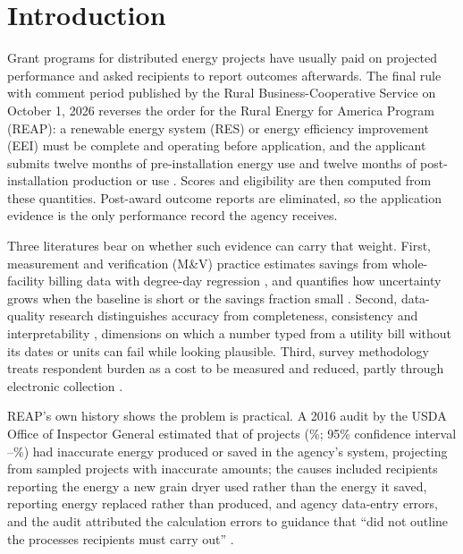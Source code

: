\documentclass[preprint,12pt]{elsarticle}
\begin{document}
\section{Introduction}

Grant programs for distributed energy projects have usually paid on projected
performance and asked recipients to report outcomes afterwards. The final rule with
comment period published by the Rural Business-Cooperative Service on October 1, 2026
reverses the order for the Rural Energy for America Program (REAP): a renewable energy
system (RES) or energy efficiency improvement (EEI) must be complete and operating before
application, and the applicant submits twelve months of pre-installation energy use and
twelve months of post-installation production or use \cite{fr2026reap,ecfr4280b}. Scores
and eligibility are then computed from these quantities. Post-award outcome reports are
eliminated, so the application evidence is the only performance record the agency
receives.

Three literatures bear on whether such evidence can carry that weight. First,
measurement and verification (M\&V) practice estimates savings from whole-facility
billing data with degree-day regression \cite{kissock2003inverse,caltrack2methods,
ashrae2014guideline14,evo2022ipmvp}, and quantifies how uncertainty grows when the
baseline is short or the savings fraction small \cite{reddy2000uncertainty,
granderson2016accuracy}. Second, data-quality research distinguishes accuracy from
completeness, consistency and interpretability \cite{wang1996beyond,pipino2002data},
dimensions on which a number typed from a utility bill without its dates or units can
fail while looking plausible. Third, survey methodology treats respondent burden as a
cost to be measured and reduced, partly through electronic collection
\cite{bradburn1978respondent,haraldsen2004identifying,yan2020response,dale2007handbook}.

REAP's own history shows the problem is practical. A 2016 audit by the USDA Office of
Inspector General estimated that \OigInaccurate{} of \OigWithReports{} projects
(\OigPct\%; 95\% confidence interval \OigCiLow--\OigCiHigh\%) had inaccurate energy
produced or saved in the agency's system, projecting from \OigSampleInaccurate{} sampled
projects with inaccurate amounts; the causes included recipients reporting the energy a
new grain dryer used rather than the energy it saved, reporting energy replaced rather
than produced, and agency data-entry errors, and the audit attributed the calculation
errors to guidance that ``did not outline the processes recipients must carry out''
\cite{oig2016reap,oig2023memo}.
\end{document}
